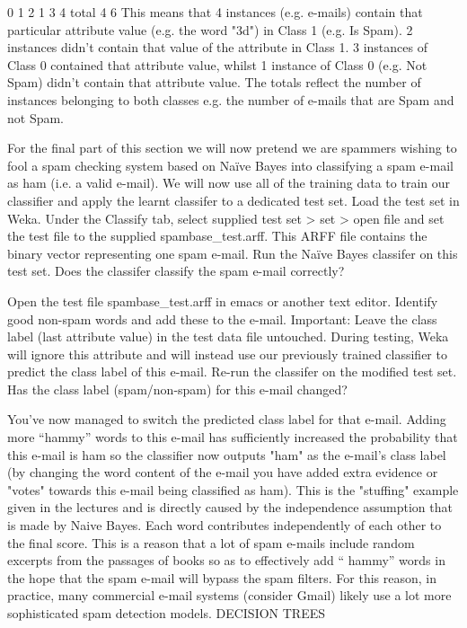 \documentclass{article}
\begin{document}
0	1
2
1	3
4
total	4	6
This means that 4 instances (e.g. e-mails) contain that particular attribute value (e.g. the word "3d") in Class 1 (e.g. Is Spam). 2 instances didn't contain that value of the attribute in Class 1. 3 instances of Class 0 contained that attribute value, whilst 1 instance of Class 0 (e.g. Not Spam) didn't contain that attribute value. The totals reflect the number of instances belonging to both classes e.g. the number of e-mails that are Spam and not Spam.

For the final part of this section we will now pretend we are spammers wishing to fool a spam checking system based on Naïve Bayes into classifying a spam e-mail as ham (i.e. a valid e-mail). We will now use all of the training data to train our classifier and apply the learnt classifer to a dedicated test set. Load the test set in Weka. Under the Classify tab, select supplied test set > set > open file and set the test file to the supplied spambase_test.arff. This ARFF file contains the binary vector representing one spam e-mail. Run the Naïve Bayes classifer on this test set. Does the classifer classify the spam e-mail correctly?

Open the test file spambase_test.arff in emacs or another text editor. Identify good non-spam words and add these to the e-mail. Important: Leave the class label (last attribute value) in the test data file untouched. During testing, Weka will ignore this attribute and will instead use our previously trained classifier to predict the class label of this e-mail. Re-run the classifer on the modified test set. Has the class label (spam/non-spam) for this e-mail changed?

You've now managed to switch the predicted class label for that e-mail. Adding more “hammy” words to this e-mail has sufficiently increased the probability that this e-mail is ham so the classifier now outputs "ham" as the e-mail's class label (by changing the word content of the e-mail you have added extra evidence or "votes" towards this e-mail being classified as ham). This is the "stuffing" example given in the lectures and is directly caused by the independence assumption that is made by Naive Bayes. Each word contributes independently of each other to the final score. This is a reason that a lot of spam e-mails include random excerpts from the passages of books so as to effectively add “ hammy” words in the hope that the spam e-mail will bypass the spam filters. For this reason, in practice, many commercial e-mail systems (consider Gmail) likely use a lot more sophisticated spam detection models.
DECISION TREES
\end{document}
